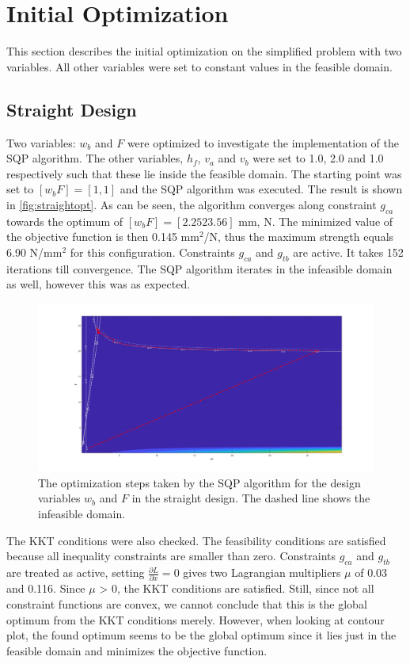 \section{Initial Optimization}
This section describes the initial optimization on the simplified problem with two variables. All other variables were set to constant values in the feasible domain. 
\subsection{Straight Design}
Two variables: $w_b$ and $F$ were optimized to investigate the implementation of the SQP algorithm. The other variables, $h_f$, $v_a$ and $v_b$ were set to 1.0, 2.0 and 1.0 respectively such that these lie inside the feasible domain. The starting point was set to $[w_b F] = [1, 1]$ and the SQP algorithm was executed. The result is shown in \autoref{fig:straightopt}. As can be seen, the algorithm converges along constraint $g_{ca}$ towards the optimum of $[w_b F] = [2.25 23.56]$ mm, N. The minimized value of the objective function is then 0.145 mm$^2$/N, thus the maximum strength equals 6.90 N/mm$^2$ for this configuration. Constraints $g_{ca}$ and $g_{tb}$ are active. It takes 152 iterations till convergence. The SQP algorithm iterates in the infeasible domain as well, however this was as expected.


\begin{figure}[H]
	\centering
	\includegraphics[width=\columnwidth]{sources/plots/straight2var.png}
	\caption{The optimization steps taken by the SQP algorithm for the design variables $w_b$ and $F$ in the straight design. The dashed line shows the infeasible domain.}
	\label{fig:straightopt}
\end{figure}


The KKT conditions were also checked. The feasibility conditions are satisfied because all inequality constraints are smaller than zero. Constraints $g_{ca}$ and $g_{tb}$ are treated as active, setting $\frac{\partial L}{\partial x} = 0$ gives two Lagrangian multipliers $\mu$ of 0.03 and 0.116. Since $\mu$ > 0, the KKT conditions are satisfied. Still, since not all constraint functions are convex, we cannot conclude that this is the global optimum from the KKT conditions merely. However, when looking at contour plot, the found optimum seems to be the global optimum since it lies just in the feasible domain and minimizes the objective function. 

